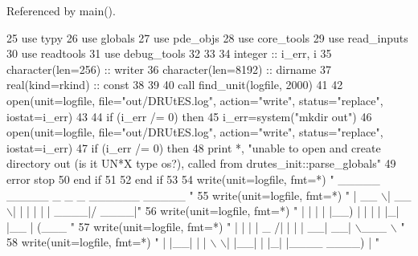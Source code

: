 Referenced by main().


\begin{DoxyCode}
25       \textcolor{keywordtype}{use }typy
26       \textcolor{keywordtype}{use }globals
27       \textcolor{keywordtype}{use }pde_objs
28       \textcolor{keywordtype}{use }core_tools
29       \textcolor{keywordtype}{use }read_inputs
30       \textcolor{keywordtype}{use }readtools
31       \textcolor{keywordtype}{use }debug_tools
32 
33 
34       \textcolor{keywordtype}{integer} :: i\_err, i
35       \textcolor{keywordtype}{character(len=256)} ::  writer
36       \textcolor{keywordtype}{character(len=8192)} :: dirname
37       \textcolor{keywordtype}{real(kind=rkind)} :: const
38 
39 
40       \textcolor{keyword}{call }find_unit(logfile, 2000)
41 
42       \textcolor{keyword}{open}(unit=logfile, file=\textcolor{stringliteral}{"out/DRUtES.log"}, action=\textcolor{stringliteral}{"write"}, status=\textcolor{stringliteral}{"replace"}\textcolor{comment}{, iostat=i\_err)}
43 \textcolor{comment}{      }
44 \textcolor{comment}{      }\textcolor{keywordflow}{if} (i\_err /= 0) \textcolor{keywordflow}{then}
45         i\_err=system(\textcolor{stringliteral}{"mkdir out"})
46         \textcolor{keyword}{open}(unit=logfile, file=\textcolor{stringliteral}{"out/DRUtES.log"}, action=\textcolor{stringliteral}{"write"}, status\textcolor{comment}{=}\textcolor{stringliteral}{"replace"}\textcolor{comment}{, iostat=i\_err)}
47 \textcolor{comment}{        }\textcolor{keywordflow}{if} (i\_err /= 0) \textcolor{keywordflow}{then}
48           print *, \textcolor{stringliteral}{"unable to open and create directory out (is it UN*X type os?), called  from
       drutes\_init::parse\_globals"}
49           error stop
50 \textcolor{keywordflow}{        end if}
51           
52 \textcolor{keywordflow}{      end if}
53       
54       \textcolor{keyword}{write}(unit=logfile, fmt=*)  \textcolor{stringliteral}{"  \_\_\_\_\_  \_\_\_\_\_  \_    \_ \_   \_\_\_\_\_\_  \_\_\_\_\_ "}
55       \textcolor{keyword}{write}(unit=logfile, fmt=*)  \textcolor{stringliteral}{" |  \_\_ \(\backslash\)|  \_\_ \(\backslash\)| |  | | | |  \_\_\_\_|/ \_\_\_\_|"}
56       \textcolor{keyword}{write}(unit=logfile, fmt=*)  \textcolor{stringliteral}{" | |  | | |\_\_) | |  | | |\_| |\_\_  | (\_\_\_  "}
57       \textcolor{keyword}{write}(unit=logfile, fmt=*)  \textcolor{stringliteral}{" | |  | |  \_  /| |  | | \_\_|  \_\_|  \(\backslash\)\_\_\_ \(\backslash\) "}
58       \textcolor{keyword}{write}(unit=logfile, fmt=*)  \textcolor{stringliteral}{" | |\_\_| | | \(\backslash\) \(\backslash\)| |\_\_| | |\_| |\_\_\_\_ \_\_\_\_) | "}

\end{DoxyCode}
